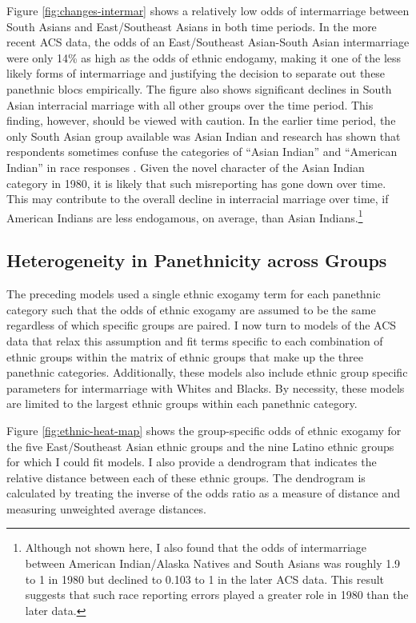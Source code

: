 \documentclass[11pt,]{article}
\begin{document}
Figure \ref{fig:changes-intermar} shows a relatively low odds of intermarriage between South Asians and East/Southeast Asians in both time periods. In the more recent ACS data, the odds of an East/Southeast Asian-South Asian intermarriage were only 14\% as high as the odds of ethnic endogamy, making it one of the less likely forms of intermarriage and justifying the decision to separate out these panethnic blocs empirically. The figure also shows significant declines in South Asian interracial marriage with all other groups over the time period. This finding, however, should be viewed with caution. In the earlier time period, the only South Asian group available was Asian Indian and research has shown that respondents sometimes confuse the categories of ``Asian Indian'' and ``American Indian'' in race responses \citep{liebler_american_2004}. Given the novel character of the Asian Indian category in 1980, it is likely that such misreporting has gone down over time. This may contribute to the overall decline in interracial marriage over time, if American Indians are less endogamous, on average, than Asian Indians.\footnote{Although not shown here, I also found that the odds of intermarriage between American Indian/Alaska Natives and South Asians was roughly 1.9 to 1 in 1980 but declined to 0.103 to 1 in the later ACS data. This result suggests that such race reporting errors played a greater role in 1980 than the later data.}

\hypertarget{heterogeneity-in-panethnicity-across-groups}{%
\subsection{Heterogeneity in Panethnicity across Groups}\label{heterogeneity-in-panethnicity-across-groups}}

The preceding models used a single ethnic exogamy term for each panethnic category such that the odds of ethnic exogamy are assumed to be the same regardless of which specific groups are paired. I now turn to models of the ACS data that relax this assumption and fit terms specific to each combination of ethnic groups within the matrix of ethnic groups that make up the three panethnic categories. Additionally, these models also include ethnic group specific parameters for intermarriage with Whites and Blacks. By necessity, these models are limited to the largest ethnic groups within each panethnic category.

Figure \ref{fig:ethnic-heat-map} shows the group-specific odds of ethnic exogamy for the five East/Southeast Asian ethnic groups and the nine Latino ethnic groups for which I could fit models. I also provide a dendrogram that indicates the relative distance between each of these ethnic groups. The dendrogram is calculated by treating the inverse of the odds ratio as a measure of distance and measuring unweighted average distances.
\end{document}
